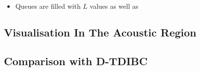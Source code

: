 \begin{itemize}
\item Queues are filled with $L$ values as well as 
\end{itemize}



\subsection{Visualisation In The Acoustic Region}







\subsection{Comparison with D-TDIBC}





